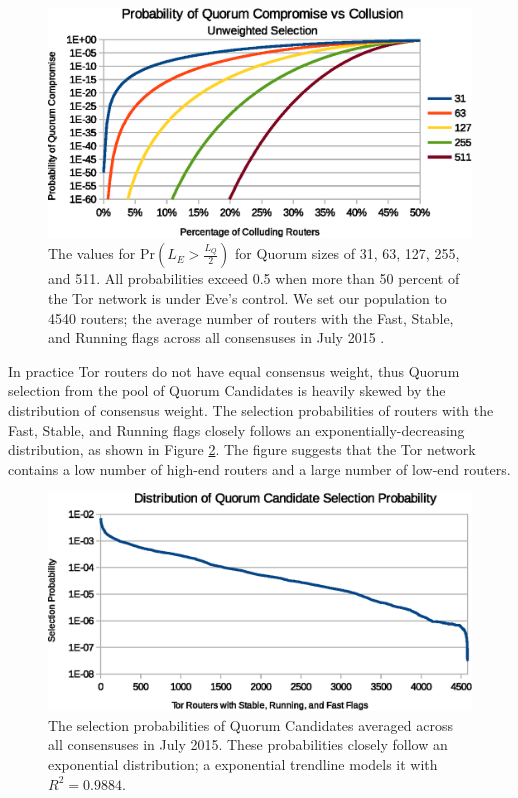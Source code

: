 \documentclass[conference]{IEEEtran}
\begin{document}
\begin{figure}[htbp]
	\centering
	\includegraphics[width=\linewidth]{../assets/analysis/QuorumSelectionUnweighted.eps}
	\caption{The values for $ \mathrm{Pr}(L_{E} > \frac{L_{Q}}{2}) $ for Quorum sizes of 31, 63, 127, 255, and 511. All probabilities exceed 0.5 when more than 50 percent of the Tor network is under Eve's control. We set our population to 4540 routers; the average number of routers with the Fast, Stable, and Running flags across all consensuses in July 2015 \cite{TorMetrics}.}
	\label{fig:quorumUnweightedMajority}
\end{figure}

In practice Tor routers do not have equal consensus weight, thus Quorum selection from the pool of Quorum Candidates is heavily skewed by the distribution of consensus weight. The selection probabilities of routers with the Fast, Stable, and Running flags closely follows an exponentially-decreasing distribution, as shown in Figure \ref{fig:weightDist}. The figure suggests that the Tor network contains a low number of high-end routers and a large number of low-end routers.

\begin{figure}[htbp]
	\centering
	\includegraphics[width=\linewidth]{../assets/analysis/QuorumCandidateWeights.eps}
	\caption{The selection probabilities of Quorum Candidates averaged across all consensuses in July 2015. These probabilities closely follow an exponential distribution; a exponential trendline models it with $ R^{2} = 0.9884 $.}
	\label{fig:weightDist}
\end{figure}
\end{document}
